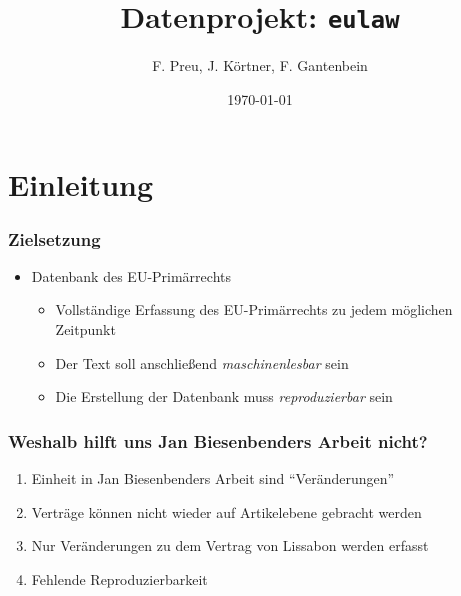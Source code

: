 \documentclass[xcolor=dvipsnames]{beamer} %
\date{\today}
\title{Datenprojekt: \texttt{eulaw}}
\author{F. Preu, J. Körtner, F. Gantenbein}
\begin{document}
\frame{
\maketitle
}

\section{Einleitung}

\begin{frame}
  \frametitle{Zielsetzung}
  \begin{itemize}
  \item Datenbank des EU-Primärrechts
    \begin{itemize}
    \item Vollständige Erfassung des EU-Primärrechts zu jedem möglichen Zeitpunkt
    \item Der Text soll anschließend \textit{maschinenlesbar} sein
    \item Die Erstellung der Datenbank muss \textit{reproduzierbar} sein
    \end{itemize}
  \end{itemize}
\end{frame}


\begin{frame}
  \frametitle{Weshalb hilft uns Jan Biesenbenders Arbeit nicht?}
  \begin{enumerate}
  \item Einheit in Jan Biesenbenders Arbeit sind \enquote{Veränderungen}
  \item Verträge können nicht wieder auf Artikelebene gebracht werden
  \item Nur Veränderungen zu dem Vertrag von Lissabon werden erfasst
  \item Fehlende Reproduzierbarkeit
  \end{enumerate}
\end{frame}
\end{document}
